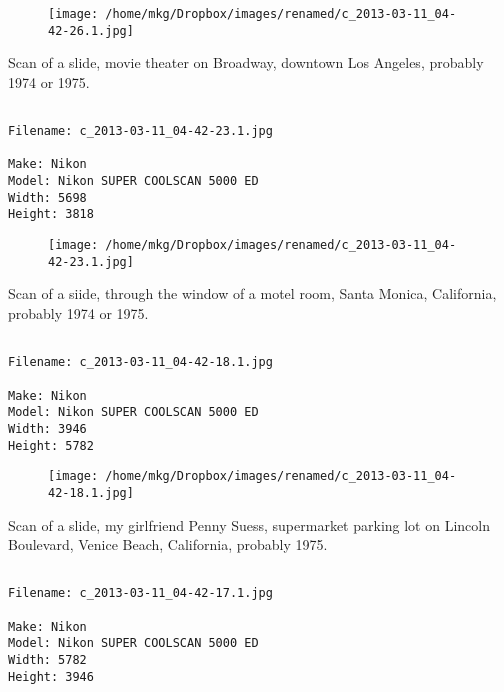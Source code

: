 \begin{figure}
\texttt{[image: /home/mkg/Dropbox/images/renamed/c\_2013-03-11\_04-42-26.1.jpg]}
\end{figure}
    
\clearpage
\onecolumn
\noindent Scan of a slide, movie theater on Broadway, downtown Los Angeles, probably 1974 or 1975.
\noindent
\begin{lstlisting}

Filename: c_2013-03-11_04-42-23.1.jpg

Make: Nikon
Model: Nikon SUPER COOLSCAN 5000 ED
Width: 5698
Height: 3818
\end{lstlisting}
\clearpage

\begin{figure}
\texttt{[image: /home/mkg/Dropbox/images/renamed/c\_2013-03-11\_04-42-23.1.jpg]}
\end{figure}
    
\clearpage
\onecolumn
\noindent Scan of a siide, through the window of a motel room, Santa Monica, California, probably 1974 or 1975.
\noindent
\begin{lstlisting}

Filename: c_2013-03-11_04-42-18.1.jpg

Make: Nikon
Model: Nikon SUPER COOLSCAN 5000 ED
Width: 3946
Height: 5782
\end{lstlisting}
\clearpage

\begin{figure}
\texttt{[image: /home/mkg/Dropbox/images/renamed/c\_2013-03-11\_04-42-18.1.jpg]}
\end{figure}
    
\clearpage
\onecolumn
\noindent Scan of a slide, my girlfriend Penny Suess, supermarket parking lot on Lincoln Boulevard, Venice Beach, California, probably 1975.
\noindent
\begin{lstlisting}

Filename: c_2013-03-11_04-42-17.1.jpg

Make: Nikon
Model: Nikon SUPER COOLSCAN 5000 ED
Width: 5782
Height: 3946
\end{lstlisting}
\clearpage

